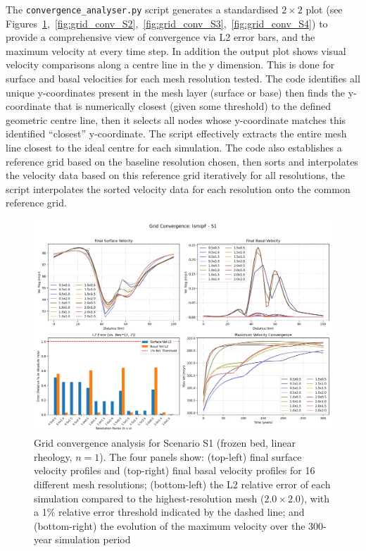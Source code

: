 The \texttt{convergence\_analyser.py} script generates a standardised $2\times2$ plot (see Figures~\ref{fig:grid_conv_S1},~\ref{fig:grid_conv_S2},~\ref{fig:grid_conv_S3},~\ref{fig:grid_conv_S4}) to provide a comprehensive view of convergence via L2 error bars, and the maximum velocity at every time step. In addition the output plot shows visual velocity comparisons along a centre line in the y dimension. This is done for surface and basal velocities for each mesh resolution tested. The code identifies all unique y-coordinates present in the mesh layer (surface or base) then finds the y-coordinate that is numerically closest (given some threshold) to the defined geometric centre line, then it selects all nodes whose y-coordinate matches this identified ``closest'' y-coordinate. The script effectively extracts the entire mesh line closest to the ideal centre for each simulation. The code also establishes a reference grid based on the baseline resolution chosen, then sorts and interpolates the velocity data based on this reference grid iteratively for all resolutions, the script interpolates the sorted velocity data for each resolution onto the common reference grid. 
\begin{figure}[H]
    \includegraphics[scale=0.40]{figures/IsmipF_S1_convergence_summary.png}
    \caption{Grid convergence analysis for Scenario S1 (frozen bed, linear rheology, $n=1$). The four panels show: (top-left) final surface velocity profiles and (top-right) final basal velocity profiles for 16 different mesh resolutions; (bottom-left) the L2 relative error of each simulation compared to the highest-resolution mesh ($2.0\times2.0$), with a 1\% relative error threshold indicated by the dashed line; and (bottom-right) the evolution of the maximum velocity over the 300-year simulation period}
    \label{fig:grid_conv_S1}
\end{figure}
